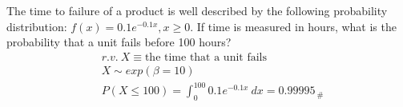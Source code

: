The time to failure of a product is well described by the following probability distribution: $f(x) = 0.1e^{-0.1x}, x \geq 0$. If time is measured in hours, what is the probability that a unit fails before 100 hours?
    \begin{align*}
        &r.v. \ X \equiv \text{the time that a unit fails}\\
        &X \sim exp(\beta = 10)\\
        &P(X \leq 100) = \int_{0}^{100} 0.1e^{-0.1x} \ dx = 0.99995_{ \ \#}\\
    \end{align*}


